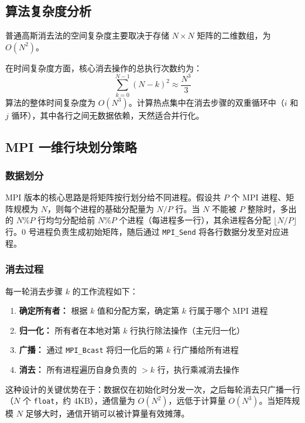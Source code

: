 \documentclass[a4paper]{article}
\begin{document}
\subsection{算法复杂度分析}

普通高斯消去法的空间复杂度主要取决于存储 $N \times N$ 矩阵的二维数组，为 $O(N^2)$。

在时间复杂度方面，核心消去操作的总执行次数约为：
\begin{equation}
\sum_{k=0}^{N-1} (N-k)^2 \approx \frac{N^3}{3}
\end{equation}
算法的整体时间复杂度为 $O(N^3)$。计算热点集中在消去步骤的双重循环中（$i$ 和 $j$ 循环），其中各行之间无数据依赖，天然适合并行化。

\subsection{MPI 一维行块划分策略}

\subsubsection{数据划分}

MPI 版本的核心思路是将矩阵按行划分给不同进程。假设共 $P$ 个 MPI 进程、矩阵规模为 $N$，则每个进程的基础分配量为 $N/P$ 行。当 $N$ 不能被 $P$ 整除时，多出的 $N\%P$ 行均匀分配给前 $N\%P$ 个进程（每进程多一行），其余进程各分配 $\lfloor N/P \rfloor$ 行。0 号进程负责生成初始矩阵，随后通过 \texttt{MPI\_Send} 将各行数据分发至对应进程。

\subsubsection{消去过程}

每一轮消去步骤 $k$ 的工作流程如下：

\begin{enumerate}
    \item \textbf{确定所有者：} 根据 $k$ 值和分配方案，确定第 $k$ 行属于哪个 MPI 进程
    \item \textbf{归一化：} 所有者在本地对第 $k$ 行执行除法操作（主元归一化）
    \item \textbf{广播：} 通过 \texttt{MPI\_Bcast} 将归一化后的第 $k$ 行广播给所有进程
    \item \textbf{消去：} 所有进程遍历自身负责的 $>k$ 行，执行乘减消去操作
\end{enumerate}

这种设计的关键优势在于：数据仅在初始化时分发一次，之后每轮消去只广播一行（$N$ 个 \texttt{float}，约 4KB），通信量为 $O(N^2)$，远低于计算量 $O(N^3)$。当矩阵规模 $N$ 足够大时，通信开销可以被计算量有效摊薄。
\end{document}
